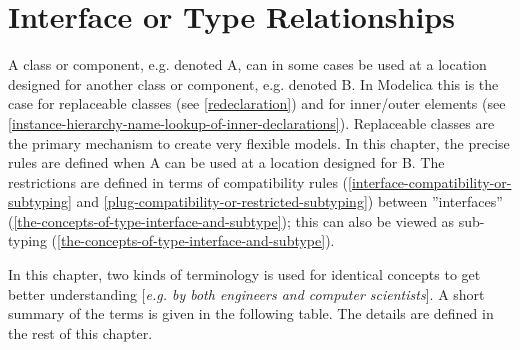 \documentclass[../MLS.tex]{subfiles}
\begin{document}
\chapter{Interface or Type Relationships}

A class or component, e.g. denoted A, can in some cases be used at a
location designed for another class or component, e.g. denoted B. In
Modelica this is the case for replaceable classes (see \autoref{redeclaration}) and
for inner/outer elements (see \autoref{instance-hierarchy-name-lookup-of-inner-declarations}).
Replaceable classes are the
primary mechanism to create very flexible models. In this chapter, the
precise rules are defined when A can be used at a location designed for
B. The restrictions are defined in terms of compatibility rules
(\autoref{interface-compatibility-or-subtyping} and \autoref{plug-compatibility-or-restricted-subtyping}) between ''interfaces'' (\autoref{the-concepts-of-type-interface-and-subtype}); this can
also be viewed as sub-typing (\autoref{the-concepts-of-type-interface-and-subtype}).

In this chapter, two kinds of terminology is used for identical concepts
to get better understanding {[}\emph{e.g. by both engineers and computer
scientists}{]}. A short summary of the terms is given in the following
table. The details are defined in the rest of this chapter.
\end{document}
